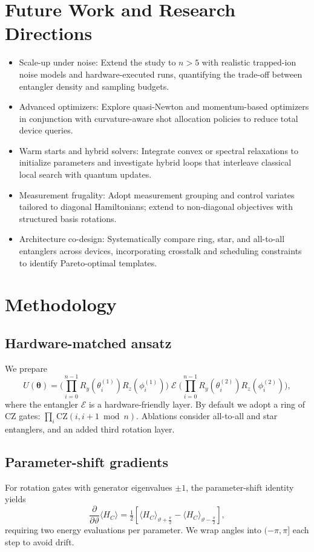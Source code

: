 \section{Future Work and Research Directions}
\begin{itemize}
    \item Scale-up under noise: Extend the study to $n{>}5$ with realistic trapped-ion noise models and hardware-executed runs, quantifying the trade-off between entangler density and sampling budgets.
    \item Advanced optimizers: Explore quasi-Newton and momentum-based optimizers in conjunction with curvature-aware shot allocation policies to reduce total device queries.
    \item Warm starts and hybrid solvers: Integrate convex or spectral relaxations to initialize parameters and investigate hybrid loops that interleave classical local search with quantum updates.
    \item Measurement frugality: Adopt measurement grouping and control variates tailored to diagonal Hamiltonians; extend to non-diagonal objectives with structured basis rotations.
    \item Architecture co-design: Systematically compare ring, star, and all-to-all entanglers across devices, incorporating crosstalk and scheduling constraints to identify Pareto-optimal templates.
\end{itemize}

\section{Methodology}
\subsection{Hardware-matched ansatz}
We prepare
\begin{equation}
U(\boldsymbol{\theta}) = \Big(\prod_{i=0}^{n-1} R_y(\theta^{(1)}_i) R_z(\phi^{(1)}_i)\Big)\; \mathcal{E}\; \Big(\prod_{i=0}^{n-1} R_y(\theta^{(2)}_i) R_z(\phi^{(2)}_i)\Big),
\end{equation}
where the entangler $\mathcal{E}$ is a hardware-friendly layer. By default we adopt a ring of CZ gates: $\prod_{i} \mathrm{CZ}(i, i{+}1 \bmod n)$. Ablations consider all-to-all and star entanglers, and an added third rotation layer.

\subsection{Parameter-shift gradients}
For rotation gates with generator eigenvalues $\pm 1$, the parameter-shift identity yields \cite{schuld2019gradients,mitarai2018quantum}
\begin{equation}
\frac{\partial}{\partial \vartheta} \langle H_C \rangle
= \tfrac{1}{2}\left[\langle H_C \rangle_{\vartheta+\frac{\pi}{2}} - \langle H_C \rangle_{\vartheta-\frac{\pi}{2}}\right],
\end{equation}
requiring two energy evaluations per parameter. We wrap angles into $(-\pi,\pi]$ each step to avoid drift.

